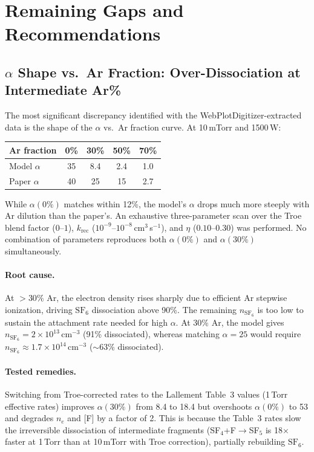 \documentclass[11pt,a4paper]{article}
\newcommand{\SFsix}{\mathrm{SF}_6}
\newcommand{\nelec}{n_e}
\begin{document}
\section{Remaining Gaps and Recommendations}

\subsection{$\alpha$ Shape vs.\ Ar Fraction: Over-Dissociation at Intermediate Ar\%}
\label{sec:alpha_shape}

The most significant discrepancy identified with the WebPlotDigitizer-extracted data is the shape of the $\alpha$ vs.\ Ar fraction curve.  At 10\,mTorr and 1500\,W:

\begin{center}
\small
\begin{tabular}{lcccc}
\toprule
Ar fraction & 0\% & 30\% & 50\% & 70\% \\
\midrule
Model $\alpha$ & 35 & 8.4 & 2.4 & 1.0 \\
Paper $\alpha$ & 40 & 25 & 15 & 2.7 \\
\bottomrule
\end{tabular}
\end{center}

While $\alpha(0\%)$ matches within 12\%, the model's $\alpha$ drops much more steeply with Ar dilution than the paper's.  An exhaustive three-parameter scan over the Troe blend factor ($0$--$1$), $k_\mathrm{rec}$ ($10^{-9}$--$10^{-8}$\,cm$^3$\,s$^{-1}$), and $\eta$ ($0.10$--$0.30$) was performed.  No combination of parameters reproduces both $\alpha(0\%)$ and $\alpha(30\%)$ simultaneously.

\paragraph{Root cause.} At $>30\%$ Ar, the electron density rises sharply due to efficient Ar stepwise ionization, driving $\SFsix$ dissociation above 90\%.  The remaining $n_{\SFsix}$ is too low to sustain the attachment rate needed for high $\alpha$.  At 30\% Ar, the model gives $n_{\SFsix} = 2 \times 10^{13}$\,cm$^{-3}$ (91\% dissociated), whereas matching $\alpha = 25$ would require $n_{\SFsix} \approx 1.7 \times 10^{14}$\,cm$^{-3}$ ($\sim$63\% dissociated).

\paragraph{Tested remedies.}  Switching from Troe-corrected rates to the Lallement Table~3 values (1\,Torr effective rates) improves $\alpha(30\%)$ from 8.4 to 18.4 but overshoots $\alpha(0\%)$ to 53 and degrades $\nelec$ and [F] by a factor of 2.  This is because the Table~3 rates slow the irreversible dissociation of intermediate fragments (SF$_4$+F$\to$SF$_5$ is 18$\times$ faster at 1\,Torr than at 10\,mTorr with Troe correction), partially rebuilding $\SFsix$.
\end{document}
